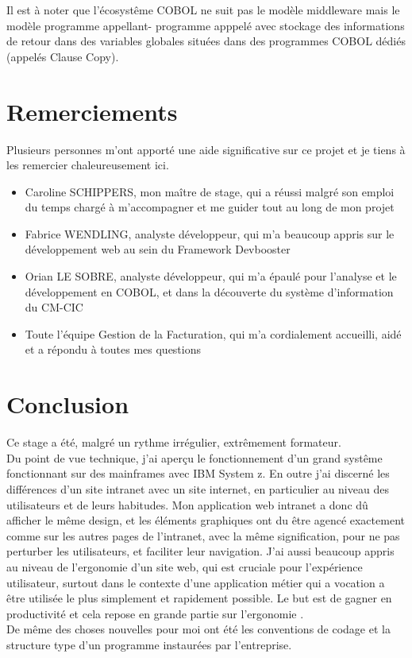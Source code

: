 \documentclass[a4paper,french,8pt]{article}
\begin{document}
			Il est à noter que l'écosystême COBOL ne suit pas le modèle middleware mais le modèle programme appellant- programme apppelé avec stockage des informations de retour dans des variables globales situées dans
			des programmes COBOL dédiés (appelés Clause Copy).

			
\section{Remerciements}

	Plusieurs personnes m’ont apporté une aide significative sur ce projet et je tiens à les remercier chaleureusement ici. 

	\begin{itemize}
		\item Caroline \textsc{SCHIPPERS}, mon maître de stage, qui a réussi malgré son emploi du temps chargé à m’accompagner et me guider tout au long de mon projet
		\item Fabrice \textsc{WENDLING}, analyste développeur, qui m’a beaucoup appris sur le développement web au sein du Framework Devbooster
		\item Orian \textsc{LE SOBRE}, analyste développeur, qui m’a épaulé pour l’analyse et le développement en COBOL, et dans la découverte du système d’information du CM-CIC
		\item Toute l’équipe Gestion de la Facturation, qui m’a cordialement accueilli, aidé et a répondu à toutes mes questions
	\end{itemize}

  
  
\section{Conclusion}


		Ce stage a été, malgré un rythme irrégulier, extrêmement formateur. \\
		
		
		Du point de vue technique, j'ai aperçu le fonctionnement d'un grand systême fonctionnant sur des mainframes avec IBM System z. 
		En outre j'ai discerné les différences d'un site intranet avec un site internet, en particulier au niveau des utilisateurs et de leurs habitudes. Mon application web intranet a donc dû afficher 
		le même design, et les éléments graphiques ont du être agencé exactement comme sur les autres pages de l'intranet, avec la même signification, pour ne pas perturber les utilisateurs, et faciliter leur navigation.
		J'ai aussi beaucoup appris au niveau de l'ergonomie d'un site web, qui est cruciale pour l'expérience utilisateur, surtout dans le contexte d'une application métier qui a vocation a être utilisée
		le plus simplement et rapidement possible. Le but est de gagner en productivité et cela repose en grande partie sur l'ergonomie .\\
		De même des choses nouvelles pour moi ont été les conventions de codage et la structure type d'un programme instaurées par l'entreprise.
		
\end{document}
